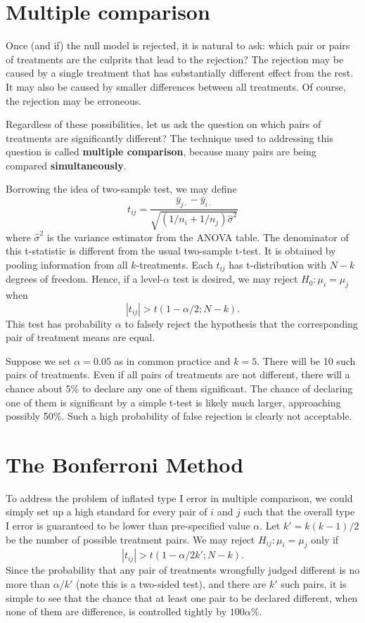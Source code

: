 \section{Multiple comparison}

Once (and if) the null model is rejected, it is natural to ask: which
pair or pairs of treatments are the culprits that lead to the rejection? 
The rejection may be caused
by a single treatment that has substantially different
effect from the rest. 
It may also be caused by smaller differences between all treatments.
Of course, the rejection may be erroneous. 

Regardless of these possibilities, let us ask the question
on which pairs of treatments are significantly different?
The technique used to addressing this
question is called {\bf multiple comparison}, because
many pairs are being compared {\bf simultaneously}.

Borrowing the idea of two-sample test, we may define
\[
t_{ij} = \frac{ \bar y_{j \cdot} - \bar y_{i \cdot} }{\sqrt{ (1/n_i + 1/n_j) \hat \sigma^2}}
\]
where $\hat \sigma^2$ is the variance estimator from the ANOVA table. 
The denominator of this t-statistic is different from the usual two-sample t-test.
It is obtained by pooling information from all $k$-treatments. 
Each $t_{ij}$ has t-distribution with $N-k$ degrees
of freedom.  Hence, if a level-$\alpha$ test is desired, 
we may reject $H_0: \mu_i= \mu_j$ when
\[
|t_{ij}| > t( 1-\alpha/2; N-k).
\]
This test has probability $\alpha$ to falsely reject the hypothesis
that the corresponding pair of treatment means are equal.

Suppose we set $\alpha = 0.05$ as in common practice and $k=5$. 
There will be 10 such pairs of treatments. 
Even if all pairs of treatments are not different, there will a chance about
5\% to declare any one of them significant. 
The chance of declaring one of them is
significant by a simple t-test is likely much larger, 
approaching possibly 50\%.
Such a high probability of false rejection
is clearly not acceptable. 

\section{The Bonferroni Method}
To address the problem of inflated type I error
in multiple comparison, we could simply set up a high 
standard for every pair of $i$ and $j$  such that
the overall type I error is guaranteed to be lower than 
pre-specified value $\alpha$.
Let $k' = k(k-1)/2$ be the number of possible treatment pairs. 
We may reject $H_{ij}: \mu_i = \mu_j$ only if
\[
|t_{ij}| > t( 1-\alpha/2k'; N-k).
\]
Since the probability that any pair of treatments
wrongfully judged different is no more than
$\alpha/k'$ (note this is a two-sided test), and there are $k'$ such pairs, it is simple
to see that the chance that at least one pair to be declared different, when 
none of them are difference, is controlled tightly by $100\alpha \%$.

